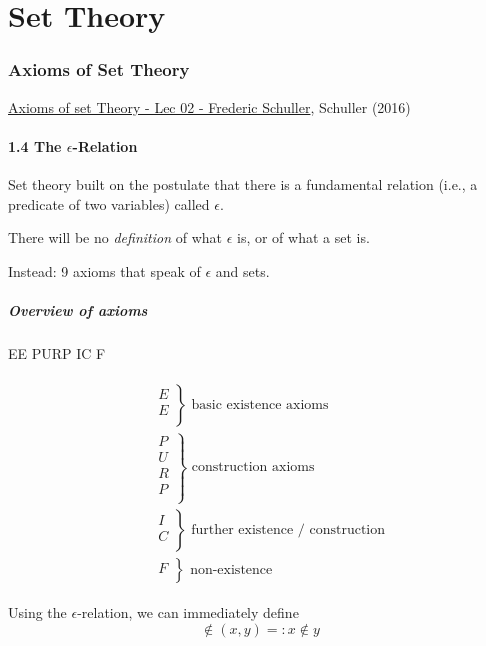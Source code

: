 \part{Set Theory}


\section{Axioms of Set Theory}

\href{https://youtu.be/AAJB9l-HAZs?si=_yI6uRj7Vg1t0BbP}{ Axioms of set Theory - Lec 02 - Frederic Schuller}, Schuller (2016) \cite{agat:Schu2016}

\subsection{1.4 The $\epsilon$-Relation}

Set theory built on the postulate that there is a fundamental relation (i.e., a predicate of two variables) called $\epsilon$.

There will be no \emph{definition} of what $\epsilon$ is, or of what a set is.

Instead: 9 axioms that speak of $\epsilon$ and sets.

\subsubsection*{Overview of axioms}

EE PURP IC F

\[
\begin{gathered}
\begin{aligned}
	& \left. \begin{aligned}
		& E \\
		& E \\
	\end{aligned} \right\rbrace \text{ basic existence axioms } \\
& \left. \begin{aligned}
	& P \\
	& U \\
	& R \\
	& P \\
\end{aligned} \right\rbrace \text{ construction axioms } \\
& \left. \begin{aligned}
	& I \\
	& C \\
\end{aligned} \right\rbrace \text{ further existence / construction } \\
& \left. \begin{aligned}
	& F \\ 
\end{aligned} \right\rbrace \text{ non-existence }
\end{aligned}
\end{gathered}
\]

Using the $\epsilon$-relation, we can immediately define 
\[
\notin(x,y) =: x \notin y
\]

